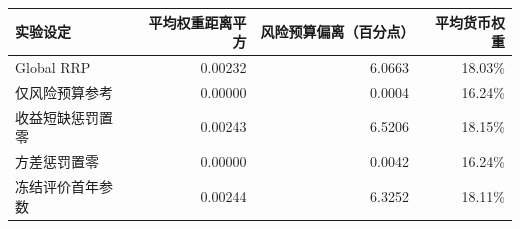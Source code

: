 \begin{tabular}{lrrr}
\toprule
实验设定 & 平均权重距离平方 & 风险预算偏离（百分点） & 平均货币权重\\\midrule
Global RRP & 0.00232 & 6.0663 & 18.03\%\\
仅风险预算参考 & 0.00000 & 0.0004 & 16.24\%\\
收益短缺惩罚置零 & 0.00243 & 6.5206 & 18.15\%\\
方差惩罚置零 & 0.00000 & 0.0042 & 16.24\%\\
冻结评价首年参数 & 0.00244 & 6.3252 & 18.11\%\\
\bottomrule
\end{tabular}